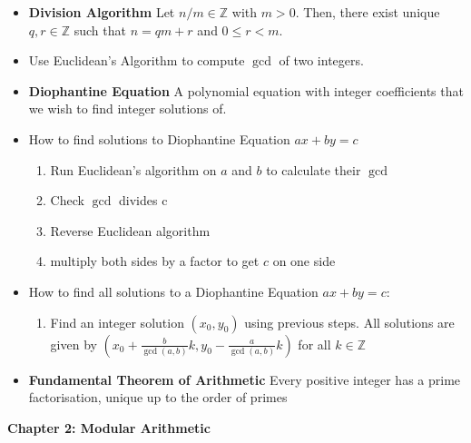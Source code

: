 \documentclass[a4paper, 12pt]
{article}
\begin{document}
	\begin{itemize}
		\item \textbf{Division Algorithm} Let $n/m \in \mathbb{Z}$ with $m>0$. Then, there exist unique $q,r \in \mathbb{Z}$ such that $n=qm+r$ and $0\leq r <m.$
		
		\item Use Euclidean's Algorithm to compute $\gcd$ of two integers.
		
		\item \textbf{Diophantine Equation} A polynomial equation with integer coefficients that we wish to find integer solutions of.
		
		\item How to find solutions to Diophantine Equation $ax + by = c$
		\begin{enumerate}
			\item Run Euclidean's algorithm on $a$ and $b$ to calculate their $\gcd$
			\item Check $\gcd$ divides c
			\item Reverse Euclidean algorithm
			\item multiply both sides by a factor to get $c$ on one side
		\end{enumerate}
		
		\newpage
		\item How to find all solutions to a Diophantine Equation $ax + by = c:$
	\begin{enumerate}
		\item Find an integer solution $(x_0,y_0)$ using previous steps. All solutions are given by $(x_0 + \frac{b}{\gcd(a,b)}k, y_0 - \frac{a}{\gcd(a,b)}k)$ for all $k \in \mathbb{Z}$
	\end{enumerate}
		
		\item \textbf{Fundamental Theorem of Arithmetic} Every positive integer has a  prime factorisation, unique up to the order of primes
	\end{itemize}
	
\hfill

\textbf{Chapter 2: Modular Arithmetic}
\end{document}
